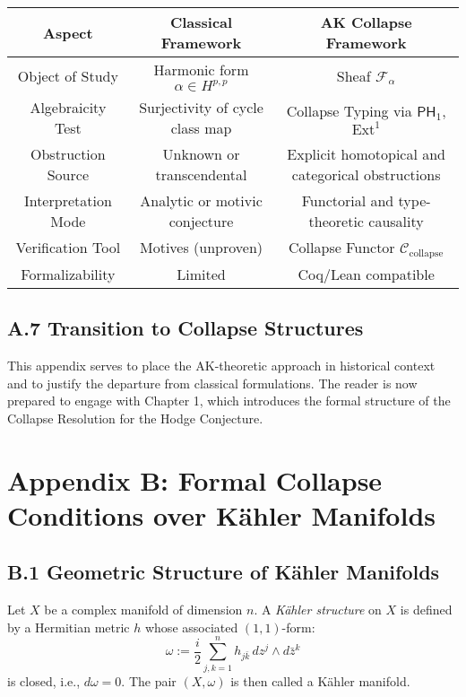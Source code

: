 \documentclass[11pt]{article}
\DeclareMathOperator{\Ext}{Ext}
\begin{document}
\begin{center}
\begin{tabular}{|c|c|c|}
\hline
\textbf{Aspect} & \textbf{Classical Framework} & \textbf{AK Collapse Framework} \\
\hline
Object of Study & Harmonic form $\alpha \in H^{p,p}$ & Sheaf $\mathcal{F}_\alpha$ \\
\hline
Algebraicity Test & Surjectivity of cycle class map & Collapse Typing via $\mathsf{PH}_1$, $\Ext^1$ \\
\hline
Obstruction Source & Unknown or transcendental & Explicit homotopical and categorical obstructions \\
\hline
Interpretation Mode & Analytic or motivic conjecture & Functorial and type-theoretic causality \\
\hline
Verification Tool & Motives (unproven) & Collapse Functor $\mathcal{C}_{\text{collapse}}$ \\
\hline
Formalizability & Limited & Coq/Lean compatible \\
\hline
\end{tabular}
\end{center}

\subsection*{A.7 Transition to Collapse Structures}

This appendix serves to place the AK-theoretic approach in historical context and to justify the departure from classical formulations. The reader is now prepared to engage with Chapter 1, which introduces the formal structure of the Collapse Resolution for the Hodge Conjecture.



\appendix

\section*{Appendix B: Formal Collapse Conditions over Kähler Manifolds}

\subsection*{B.1 Geometric Structure of Kähler Manifolds}

Let $X$ be a complex manifold of dimension $n$. A \emph{Kähler structure} on $X$ is defined by a Hermitian metric $h$ whose associated $(1,1)$-form:
\[
\omega := \frac{i}{2} \sum_{j,k=1}^n h_{j\bar{k}} \, dz^j \wedge d\bar{z}^k
\]
is closed, i.e., $d\omega = 0$. The pair $(X,\omega)$ is then called a Kähler manifold.
\end{document}
